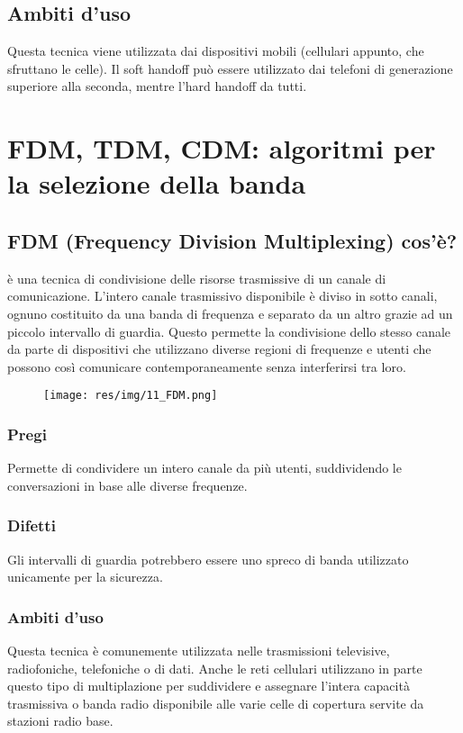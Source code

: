\subsection{Ambiti d'uso}
Questa tecnica viene utilizzata dai dispositivi mobili (cellulari appunto, che sfruttano le celle). Il soft handoff può essere utilizzato dai telefoni di generazione superiore alla seconda, mentre l'hard handoff da tutti.

\section{FDM, TDM, CDM: algoritmi per la selezione della banda}
\subsection{FDM (Frequency Division Multiplexing) cos'è?}
è una tecnica di condivisione delle risorse trasmissive di un canale di comunicazione. L'intero canale trasmissivo disponibile è diviso in sotto canali, ognuno costituito da una banda di frequenza e separato da un altro grazie ad un piccolo intervallo di guardia.
Questo permette la condivisione dello stesso canale da parte di dispositivi che utilizzano diverse regioni di frequenze e utenti che possono così comunicare contemporaneamente senza interferirsi tra loro.

\begin{figure}[H]
\centering
\texttt{[image: res/img/11\_FDM.png]}
\end{figure}
\subsubsection{Pregi}
Permette di condividere un intero canale da più utenti, suddividendo le conversazioni in base alle diverse frequenze.
\subsubsection{Difetti}
Gli intervalli di guardia potrebbero essere uno spreco di banda utilizzato unicamente per la sicurezza.
\subsubsection{Ambiti d'uso}
Questa tecnica è comunemente utilizzata nelle trasmissioni televisive, radiofoniche, telefoniche o di dati. Anche le reti cellulari utilizzano in parte questo tipo di multiplazione per suddividere e assegnare l'intera capacità trasmissiva o banda radio disponibile alle varie celle di copertura servite da stazioni radio base.


